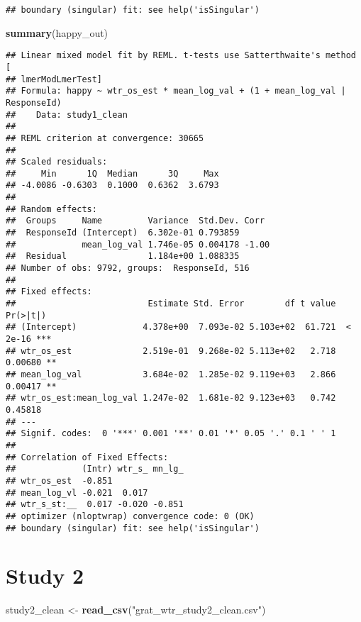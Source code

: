 \documentclass[
]{article}
\newenvironment{Shaded}{\begin{snugshade}}{\end{snugshade}}
\newcommand{\FunctionTok}[1]{\textcolor[rgb]{0.13,0.29,0.53}{\textbf{#1}}}
\newcommand{\NormalTok}[1]{#1}
\newcommand{\OtherTok}[1]{\textcolor[rgb]{0.56,0.35,0.01}{#1}}
\newcommand{\StringTok}[1]{\textcolor[rgb]{0.31,0.60,0.02}{#1}}
\begin{document}
\begin{verbatim}
## boundary (singular) fit: see help('isSingular')
\end{verbatim}

\begin{Shaded}
\begin{Highlighting}[]
\FunctionTok{summary}\NormalTok{(happy\_out)}
\end{Highlighting}
\end{Shaded}

\begin{verbatim}
## Linear mixed model fit by REML. t-tests use Satterthwaite's method [
## lmerModLmerTest]
## Formula: happy ~ wtr_os_est * mean_log_val + (1 + mean_log_val | ResponseId)
##    Data: study1_clean
## 
## REML criterion at convergence: 30665
## 
## Scaled residuals: 
##     Min      1Q  Median      3Q     Max 
## -4.0086 -0.6303  0.1000  0.6362  3.6793 
## 
## Random effects:
##  Groups     Name         Variance  Std.Dev. Corr 
##  ResponseId (Intercept)  6.302e-01 0.793859      
##             mean_log_val 1.746e-05 0.004178 -1.00
##  Residual                1.184e+00 1.088335      
## Number of obs: 9792, groups:  ResponseId, 516
## 
## Fixed effects:
##                          Estimate Std. Error        df t value Pr(>|t|)    
## (Intercept)             4.378e+00  7.093e-02 5.103e+02  61.721  < 2e-16 ***
## wtr_os_est              2.519e-01  9.268e-02 5.113e+02   2.718  0.00680 ** 
## mean_log_val            3.684e-02  1.285e-02 9.119e+03   2.866  0.00417 ** 
## wtr_os_est:mean_log_val 1.247e-02  1.681e-02 9.123e+03   0.742  0.45818    
## ---
## Signif. codes:  0 '***' 0.001 '**' 0.01 '*' 0.05 '.' 0.1 ' ' 1
## 
## Correlation of Fixed Effects:
##             (Intr) wtr_s_ mn_lg_
## wtr_os_est  -0.851              
## mean_log_vl -0.021  0.017       
## wtr_s_st:__  0.017 -0.020 -0.851
## optimizer (nloptwrap) convergence code: 0 (OK)
## boundary (singular) fit: see help('isSingular')
\end{verbatim}

\hypertarget{study-2}{%
\section{Study 2}\label{study-2}}

\begin{Shaded}
\begin{Highlighting}[]
\NormalTok{study2\_clean }\OtherTok{\textless{}{-}} \FunctionTok{read\_csv}\NormalTok{(}\StringTok{"grat\_wtr\_study2\_clean.csv"}\NormalTok{)}
\end{Highlighting}
\end{Shaded}
\end{document}
